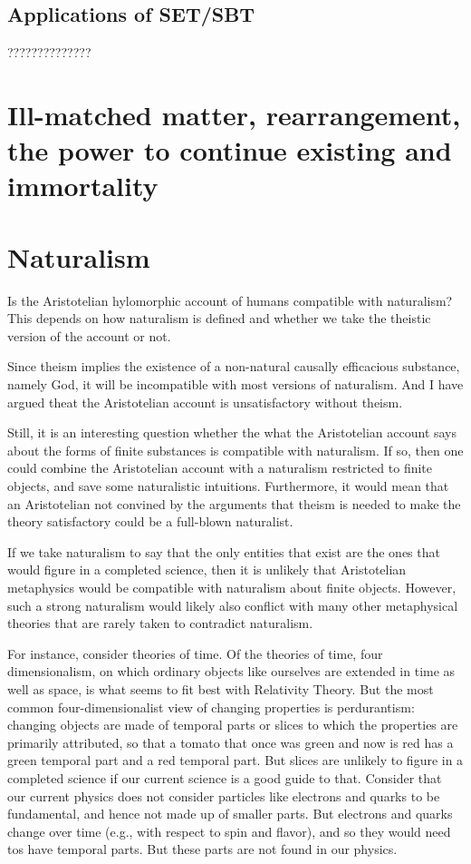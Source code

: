 \subsection{Applications of SET/SBT}
??????????????

\section{Ill-matched matter, rearrangement, the power to continue existing and immortality}


\section{Naturalism}
Is the Aristotelian hylomorphic account of humans compatible with naturalism? This depends on how naturalism
is defined and whether we take the theistic version of the account or not.

Since theism implies the existence of a non-natural causally efficacious substance, namely God, it will be incompatible
with most versions of naturalism. And I have argued theat the Aristotelian account is unsatisfactory without
theism. 

Still, it is an interesting question whether the what the Aristotelian account says about the forms of finite
substances is compatible with naturalism. If so, then one could combine the Aristotelian account with 
a naturalism restricted to finite objects, and save some naturalistic intuitions. Furthermore, it would mean
that an Aristotelian not convined by the arguments that theism is needed to make the theory satisfactory could
be a full-blown naturalist.

If we take naturalism to say that the only entities that exist are the ones that would figure in a completed science,
then it is unlikely that Aristotelian metaphysics would be compatible with naturalism about finite objects. However,
such a strong naturalism would likely also conflict with many other metaphysical theories that are rarely taken to 
contradict naturalism. 

For instance, consider theories of time. Of the theories of time, four dimensionalism, on which
ordinary objects like ourselves are extended in time as well as space, is what seems to fit best with Relativity Theory. 
But the most common four-dimensionalist view of changing properties is perdurantism: changing objects are made of temporal parts or
slices to which the properties are primarily attributed, so that a tomato that once was green and now is red has a green temporal part
and a red temporal part. But slices are unlikely to figure in a completed science if
our current science is a good guide to that. Consider that our current physics does not consider particles
like electrons and quarks to be fundamental, and hence not made up of smaller parts. But electrons and quarks change over
time (e.g., with respect to spin and flavor), and so they would need tos have temporal parts.  But these parts are not found
in our physics. 


